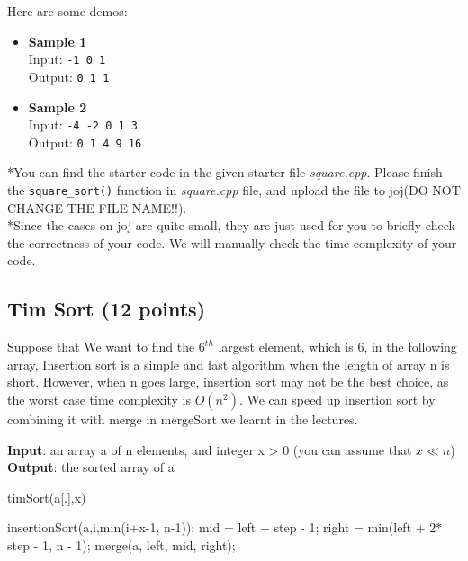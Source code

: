 \documentclass[11pt]{exam}
\begin{document}
Here are some demos:
\begin{itemize}
    \item \textbf{Sample 1}\\
    Input: \lstinline|-1 0 1| \\
    Output: \lstinline|0 1 1|
    \item \textbf{Sample 2}\\
    Input: \lstinline|-4 -2 0 1 3| \\
    Output: \lstinline|0 1 4 9 16|
\end{itemize}

*You can find the starter code in the given starter file \textit{square.cpp}. Please finish the \lstinline|square_sort()| function in \textit{square.cpp} file, and upload the file to joj(DO NOT CHANGE THE FILE NAME!!). \\
*Since the cases on joj are quite small, they are just used for you to briefly check the correctness of your code. We will manually check the time complexity of your code.


\subsection{Tim Sort (12 points)}
Suppose that We want to find the $6^{th}$ largest element, which is 6, in the following array, Insertion sort is a simple and fast algorithm when the length of array n is short. However, when n goes large, insertion sort may not be the best choice, as the worst case time complexity is $O(n^2)$. We can speed up insertion sort by combining it with merge in mergeSort we learnt in the lectures.

\begin{algorithm}[H]
	\textbf{Input}: an array a of n elements, and integer x > 0 (you can assume that $x\ll n$)\\
	\textbf{Output}: the sorted array of a
	\caption{timSort(a[.],x)}
	
	\begin{algorithmic}[1]
            \State insertionSort(a,i,min(i+x-1, n-1));  
        \EndFor  
                \State mid = left + step - 1;
                \State right = min(left + 2$*$step - 1, n - 1);
                \State merge(a, left, mid, right);
            \EndFor
        \EndFor
	\end{algorithmic}  
\end{algorithm}
\end{document}
